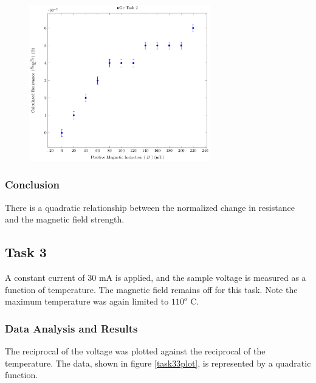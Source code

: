 \documentclass[a4paper]{article}
\begin{document}
\begin{figure}[H]
\centering
\includegraphics[width=0.7\textwidth]{NGePlots/Task2/nGeTask2.pdf}
\label{task32plot}
\end{figure}


\subsubsection{Conclusion}
\qq There is a quadratic relationship between the normalized change in
resistance and the magnetic field strength.

\subsection{Task 3}
\qq A constant current of 30 mA is applied, and the sample voltage is
 measured as a function of temperature. The magnetic field remains off
 for this task. Note the maximum temperature was again limited to
 $110^o$ C.

\subsubsection{Data Analysis and Results}
\qq The reciprocal of the voltage was plotted against the reciprocal
of the temperature. The data, shown in figure \ref{task33plot}, is
represented by a quadratic function.
\end{document}
